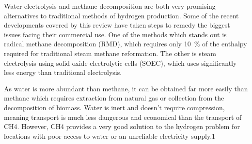 Water electrolysis and methane decomposition are both very promising alternatives to traditional methods of hydrogen production.
Some of the recent developments covered by this review have taken steps to remedy the biggest issues facing their commercial use.
One of the methods which stands out is radical methane decomposition (RMD), which requires only \SI{10}{\percent} of the enthalpy required for traditional steam methane reformation.
The other is steam electrolysis using solid oxide electrolytic cells (SOEC), which uses significantly less energy than traditional electrolysis.

As water is more abundant than methane, it can be obtained far more easily than methane which requires extraction from natural gas or collection from the decomposition of biomass.
Water is inert and doesn’t require compression, meaning transport is much less dangerous and economical than the transport of CH4.
However, CH4 provides a very good solution to the hydrogen problem for locations with poor access to water or an unreliable electricity supply.1 

